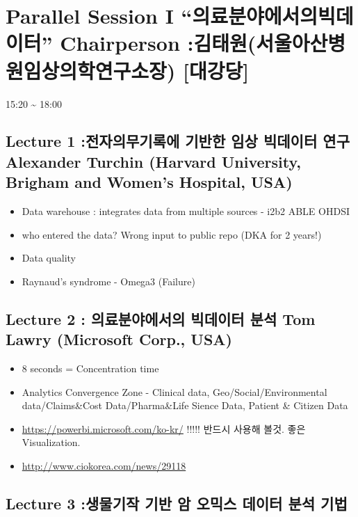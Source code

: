 \documentclass[]{book}
\providecommand{\tightlist}{%
  \setlength{\itemsep}{0pt}\setlength{\parskip}{0pt}}
\begin{document}
\section{\texorpdfstring{Parallel Session I ``의료분야에서의빅데이터''
Chairperson :김태원(서울아산병원임상의학연구소장)
{[}대강당{]}}{Parallel Session I 의료분야에서의빅데이터 Chairperson :김태원(서울아산병원임상의학연구소장) {[}대강당{]}}}\label{parallel-session-i--chairperson--}

15:20 \textasciitilde{} 18:00

\subsection{Lecture 1 :전자의무기록에 기반한 임상 빅데이터 연구
Alexander Turchin (Harvard University, Brigham and Women's Hospital,
USA)}\label{lecture-1------alexander-turchin-harvard-university-brigham-and-womens-hospital-usa}

\begin{itemize}
\tightlist
\item
  Data warehouse : integrates data from multiple sources - i2b2
  \textbar{} ABLE \textbar{} OHDSI
\item
  who entered the data? Wrong input to public repo (DKA for 2 years!)
\item
  Data quality
\item
  Raynaud's syndrome - Omega3 (Failure)
\end{itemize}

\subsection{Lecture 2 : 의료분야에서의 빅데이터 분석 Tom Lawry
(Microsoft Corp.,
USA)}\label{lecture-2----tom-lawry-microsoft-corp.-usa}

\begin{itemize}
\tightlist
\item
  8 seconds = Concentration time
\item
  Analytics Convergence Zone - Clinical data, Geo/Social/Environmental
  data/Claims\&Cost Data/Pharma\&Life Sience Data, Patient \& Citizen
  Data
\item
  \url{https://powerbi.microsoft.com/ko-kr/} !!!!! 반드시 사용해 볼것.
  좋은 Visualization.
\item
  \url{http://www.ciokorea.com/news/29118}
\end{itemize}

\subsection{Lecture 3 :생물기작 기반 암 오믹스 데이터 분석
기법}\label{lecture-3-------}
\end{document}
